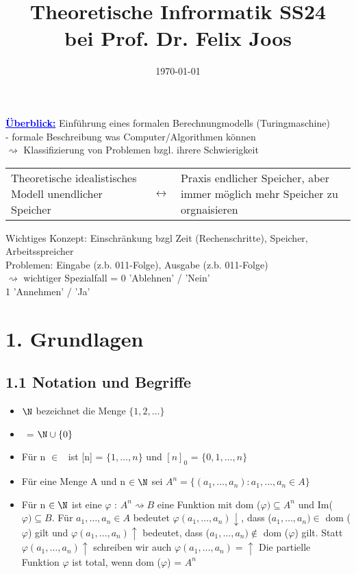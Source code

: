 \documentclass[a4paper]{article}
\title{Theoretische Infrormatik SS24 \\ bei Prof. Dr. Felix Joos}
\date{\today}
\begin{document}
\maketitle
\thispagestyle{empty}
\newpage
\tableofcontents
\newpage

\textcolor{blue}{\underline{\textbf{Überblick:}}} Einführung eines formalen Berechnungmodells (Turingmaschine) \\
\hspace*{1.9cm} - formale Beschreibung was Computer/Algorithmen können \\
\hspace*{1.9cm} $\rightsquigarrow$ Klassifizierung von Problemen bzgl. ihrere Schwierigkeit \\
\begin{xltabular}{\linewidth}{Xp{1cm}X}
    Theoretische idealistisches Modell \newline unendlicher Speicher & $\leftrightarrow$ & Praxis endlicher Speicher, aber immer möglich mehr Speicher zu orgnaisieren \\

\end{xltabular}
Wichtiges Konzept: Einschränkung bzgl Zeit (Rechenschritte), Speicher, Arbeitsspreicher\\
Problemen: Eingabe (z.b. 011-Folge), Ausgabe (z.b. 011-Folge) \\
$\rightsquigarrow$ wichtiger Spezialfall = 0 'Ablehnen' / 'Nein' \\
\hspace*{3.9cm} 1 'Annehmen' / 'Ja' \\
\section{1. Grundlagen}
\subsection{1.1 Notation und Begriffe}
\begin{itemize}
 \item $\N$ bezeichnet die Menge $\lbrace 1,2,\dots \rbrace$
 \item  \NN \ = $\N \cup \lbrace 0 \rbrace$
 \item Für n $\in$ \NN \ ist [n] = $\lbrace 1,\dots,n \rbrace$ und $[n]_0$ = $\lbrace 0,1,\dots,n \rbrace$
 \item Für eine Menge A und n $\in \N$ sei $A^n = \lbrace (a_1,\dots,a_n): a_1,\dots,a_n \in A \rbrace$
 \item Für n $\in \N$ ist eine  $\varphi$ : $A^n \rightsquigarrow B$ eine Funktion mit dom ($\varphi) \subseteq A^n$ und Im($\varphi) \subseteq B$. Für $a_1,\dots,a_n \in A$ bedeutet $\varphi(a_1,\dots,a_n)\downarrow$, dass ($a_1,\dots,a_n) \in$ dom ($\varphi$) gilt und $\varphi(a_1,\dots,a_n)\uparrow$ bedeutet, dass ($a_1,\dots,a_n) \not \in$ dom ($\varphi$) gilt. Statt $\varphi(a_1,\dots,a_n) \uparrow$ schreiben wir auch $\varphi(a_1,\dots,a_n) = \uparrow$ Die partielle Funktion $\varphi$ ist total, wenn dom ($\varphi$) = $A^n$
\end{itemize}
\end{document}
